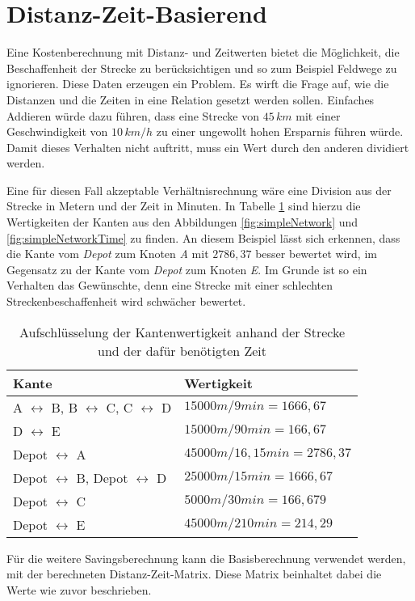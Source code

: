 \section{Distanz-Zeit-Basierend}
\label{sec:disZeitBase}

Eine Kostenberechnung mit Distanz- und Zeitwerten bietet die Möglichkeit, die Beschaffenheit der Strecke zu berücksichtigen und so zum Beispiel Feldwege zu ignorieren. 
Diese Daten erzeugen ein Problem. 
Es wirft die Frage auf, wie die Distanzen und die Zeiten in eine Relation gesetzt werden sollen. 
Einfaches Addieren würde dazu führen, dass eine Strecke von $45\,km$ mit einer Geschwindigkeit von $10\,km/h$ zu einer ungewollt hohen Ersparnis führen würde. 
Damit dieses Verhalten nicht auftritt, muss ein Wert durch den anderen dividiert werden. 

\noindent
Eine für diesen Fall akzeptable Verhältnisrechnung wäre eine Division aus der Strecke in Metern und der Zeit in Minuten. 
In Tabelle \ref{tab:disTimeValues} sind hierzu die Wertigkeiten der Kanten aus den Abbildungen \ref{fig:simpleNetwork} und \ref{fig:simpleNetworkTime} zu finden. 
An diesem Beispiel lässt sich erkennen, dass die Kante vom \textit{Depot} zum Knoten \textit{A} mit $2786,37$ besser bewertet wird, im Gegensatz zu der Kante vom \textit{Depot} zum Knoten \textit{E}. 
Im Grunde ist so ein Verhalten das Gewünschte, denn eine Strecke mit einer schlechten Streckenbeschaffenheit wird schwächer bewertet. 
\begin{table}[htb]%
\centering
\begin{tabular}{p{5cm}|p{5cm}}
Kante & Wertigkeit \\ 
\hline 
A $\leftrightarrow$ B, B $\leftrightarrow$ C, C $\leftrightarrow$ D & $15000m / 9min = 1666,67$ \\ 
D $\leftrightarrow$ E & $15000m / 90min = 166,67$ \\ 
Depot $\leftrightarrow$ A & $45000m / 16,15min = 2786,37$ \\ 
Depot $\leftrightarrow$ B, Depot $\leftrightarrow$ D & $25000m / 15min = 1666,67$ \\ 
Depot $\leftrightarrow$ C & $5000m / 30min = 166,679$ \\ 
Depot $\leftrightarrow$ E & $45000m / 210min = 214,29$ \\
\end{tabular} 
\caption{Aufschlüsselung der Kantenwertigkeit anhand der Strecke und der dafür benötigten Zeit}
\label{tab:disTimeValues}
\end{table}
Für die weitere Savingsberechnung kann die Basisberechnung verwendet werden, mit der berechneten Distanz-Zeit-Matrix. 
Diese Matrix beinhaltet dabei die Werte wie zuvor beschrieben. 

